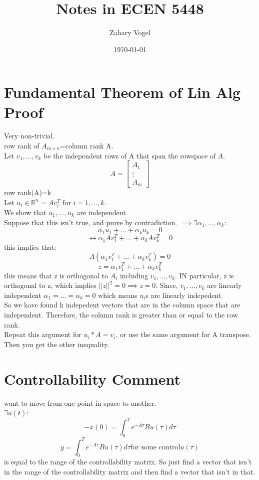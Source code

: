 \documentclass{article}
\author{Zahary Vogel}
\date{\today}
\title{Notes in ECEN 5448}
\begin{document}
\maketitle


\section*{Fundamental Theorem of Lin Alg Proof}
Very non-trivial.\\
row rank of $A_{m\times n}$=column rank A.\\
Let $v_1,\dots,v_k$ be the independent rows of A that span the rowspace of $A$.\\
\[A=\begin{bmatrix}A_1\\\vdots\\A_m\end{bmatrix}\]
row rank(A)=k\\
Let $u_i\in \mathbb{R}^n=Av_i^T$ for $i=1,\dots,k$.\\
We show that $u_1,\dots,u_k$ are independent.\\
Suppose that this isn't true, and prove by contradiction. $\implies \exists \alpha_1,\dots,\alpha_k$:\\
\[\alpha_1u_1+\dots+\alpha_ku_k=0\]
\[\leftrightarrow \alpha_1Av_1^T+\dots+\alpha_kAv_k^T=0\]
this implies that:
\[A(\alpha_1v_1^T+\dots+\alpha_kv_k^T)=0\]
\[z=\alpha_1v_1^T+\dots+\alpha_kv_k^T\]
this means that z is orthogonal to $A_i$ including $v_1,\dots,v_k$. IN particular, z is orthogonal to z, which implies $\lvert\lvert z\rvert\rvert^2=0\implies z=0$. Since, $v_1,\dots,v_k$ are linearly independent $\alpha_1=\dots=\alpha_k=0$ which means $u_i$s are linearly indepedent.\\
So we have found k indepedent vectors that are in the column space that are independent. Therefore, the column rank is greater than or equal to the row rank.\\
Repeat this argument for $u_i*A=v_i$, or use the same argument for A transpose. Then you get the other inequality.\\

\section*{Controllability Comment}
want to move from one point in space to another.\\
$\exists u(t)$:
\[-x(0)=\int_0^Te^{-A\tau}Bu(\tau)d\tau\]
\[y=\int_0^Te^{-A\tau}Bu(\tau)d\tau \text{for some control} u(\tau)\]
is equal to the range of the controllability matrix. So just find a vector that isn't in the range of the controllability matrix and then find a vector that isn't in that.\\
\end{document}
